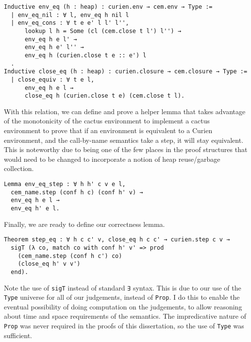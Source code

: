 \begin{verbatim}
Inductive env_eq (h : heap) : curien.env → cem.env → Type := 
  | env_eq_nil : ∀ l, env_eq h nil l
  | env_eq_cons : ∀ t e e' l l' l'',
      lookup l h = Some (cl (cem.close t l') l'') →
      env_eq h e l' →
      env_eq h e' l'' →
      env_eq h (curien.close t e :: e') l
  .
Inductive close_eq (h : heap) : curien.closure → cem.closure → Type := 
  | close_equiv : ∀ t e l, 
      env_eq h e l → 
      close_eq h (curien.close t e) (cem.close t l).
\end{verbatim}

With this relation, we can define and prove a helper lemma that takes advantage
of the monotonicity of the cactus environment to implement a cactus environment
to prove that if an environment is equivalent to a Curien environment, and the
call-by-name \ce semantics take a step, it will stay equivalent. This is
noteworthy due to being one of the few places in the proof structures that would
need to be changed to incorporate a notion of heap reuse/garbage collection.

\begin{verbatim}
Lemma env_eq_step : ∀ h h' c v e l, 
  cem_name.step (conf h c) (conf h' v) →
  env_eq h e l → 
  env_eq h' e l.
\end{verbatim}

Finally, we are ready to define our correctness lemma.

\begin{verbatim}
Theorem step_eq : ∀ h c c' v, close_eq h c c' → curien.step c v →
  sigT (λ co, match co with conf h' v' => prod 
    (cem_name.step (conf h c') co)
    (close_eq h' v v') 
  end). 
\end{verbatim}

Note the use of \texttt{sigT} instead of standard \texttt{∃} syntax. This is due
to our use of the \texttt{Type} universe for all of our judgements, instead of
\texttt{Prop}. I do this to enable the eventual possibility of doing
computation on the judgements, to allow reasoning about time and space
requirements of the semantics. The impredicative nature of \texttt{Prop} was
never required in the proofs of this dissertation, so the use of \texttt{Type}
was sufficient. 
